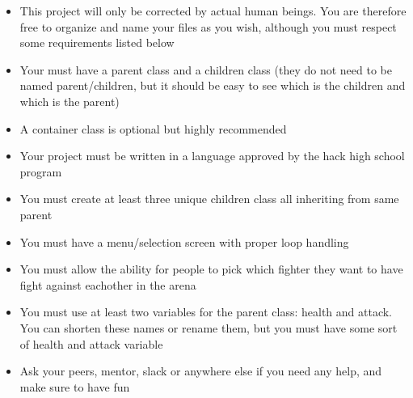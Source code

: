 \documentclass{42-en}
\begin{document}
	    \begin{itemize}
		\item This project will only be corrected by actual human beings.
		You are therefore free to organize and name your files as you wish,
		although you must respect some requirements listed below
		\item Your must have a parent class and a children class (they do not
		need to be named parent/children, but it should be easy to see
		which is the children and which is the parent)
		\item A container class is optional but highly recommended
		
				
		
		\item Your project must be written in a language approved by
		the hack high school program
		\item You must create at least three unique children class all inheriting 
		from same parent
		\item You must have a menu/selection screen with proper loop handling
		\item You must allow the ability for people to pick which fighter
		they want to have fight against eachother in the arena
		\item You must use at least two variables for the parent class:
		health and attack. You can shorten these names or rename them, but
		you must have some sort of health and attack variable
		\item Ask your peers, mentor, slack or anywhere else if you need
		any help, and make sure to have fun\\
	\end{itemize}



\end{document}
